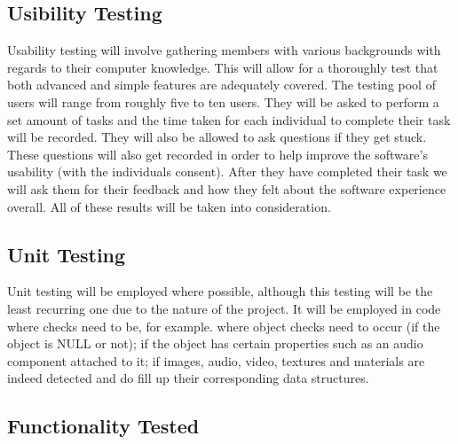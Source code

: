 	\subsection{Usibility Testing}

	Usability testing will involve gathering members with various backgrounds with regards to their computer knowledge. This will allow for a thoroughly test that both
	advanced and simple features are adequately covered. The testing pool of users will range from roughly five to ten users. They will be asked to perform a set amount of
	tasks and the time taken for each individual to complete their task will be recorded. They will also be allowed to ask questions if they get stuck. These questions will
	also get recorded in order to help improve the software’s usability (with the individuals consent). After they have completed their task we will ask them for their
	feedback and how they felt about the software experience overall. All of these results will be taken into consideration.

	\subsection{Unit Testing}

	Unit testing will be employed where possible, although this testing will be the least recurring one due to the nature of the project. It will be employed in code
	where checks need to be, for example. where object checks need to occur (if the object is NULL or not); if the object has certain properties such as an audio
	component attached to it; if images, audio, video, textures and materials are indeed detected and do fill up their corresponding data structures.

	\subsection{Functionality Tested}

